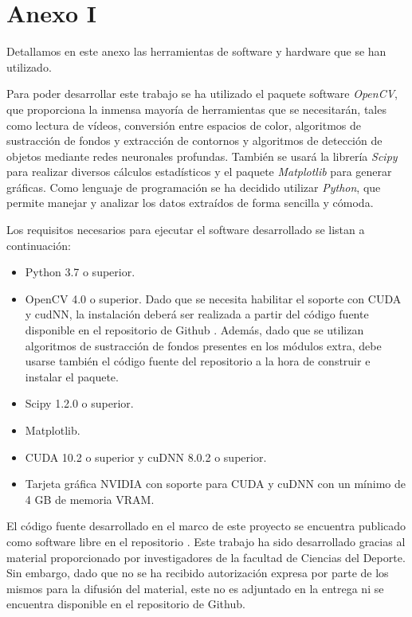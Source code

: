 \chapter*{Anexo I} \label{anexo1}

Detallamos en este anexo las herramientas de software y hardware que se han utilizado.

Para poder desarrollar este trabajo se ha utilizado el paquete software \textit{OpenCV}, que proporciona la inmensa mayoría de herramientas que se necesitarán, tales como lectura de vídeos, conversión entre espacios de color, algoritmos de sustracción de fondos y extracción de contornos y algoritmos de detección de objetos mediante redes neuronales profundas. También se usará la librería \textit{Scipy} para realizar diversos cálculos estadísticos y el paquete \textit{Matplotlib} para generar gráficas. Como lenguaje de programación se ha decidido utilizar \textit{Python}, que permite manejar y analizar los datos extraídos de forma sencilla y cómoda. 

Los requisitos necesarios para ejecutar el software desarrollado se listan a continuación:
\begin{itemize}
    \item Python 3.7 o superior.
    \item OpenCV 4.0 o superior. Dado que se necesita habilitar el soporte con CUDA y cudNN, la instalación deberá ser realizada a partir del código fuente disponible en el repositorio de Github \cite{repoopencvi}. Además, dado que se utilizan algoritmos de sustracción de fondos presentes en los módulos extra, debe usarse también el código fuente del repositorio \cite{repoopencvii} a la hora de construir e instalar el paquete.
    \item Scipy 1.2.0 o superior.
    \item Matplotlib.
    \item CUDA 10.2 o superior y cuDNN 8.0.2 o superior.
    \item Tarjeta gráfica NVIDIA con soporte para CUDA y cuDNN con un mínimo de 4 GB de memoria VRAM.
\end{itemize}

El código fuente desarrollado en el marco de este proyecto se encuentra publicado como software libre en el repositorio \cite{myownrepo}. Este trabajo ha sido desarrollado gracias al material proporcionado por investigadores de la facultad de Ciencias del Deporte. Sin embargo, dado que no se ha recibido autorización expresa por parte de los mismos para la difusión del material, este no es adjuntado en la entrega ni se encuentra disponible en el repositorio de Github.

